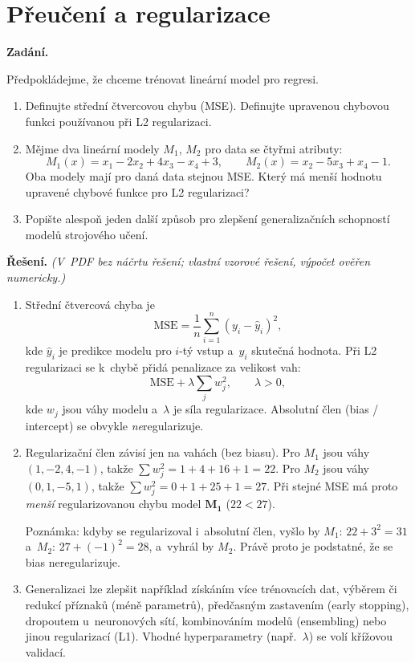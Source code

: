 \section{Přeučení a regularizace}

\noindent\textbf{Zadání.}\par
Předpokládejme, že chceme trénovat lineární model pro regresi.

\begin{enumerate}
  \item Definujte střední čtvercovou chybu (MSE). Definujte upravenou chybovou funkci používanou při L2 regularizaci.
  \item Mějme dva lineární modely $M_1$, $M_2$ pro data se čtyřmi atributy:
    \[
      M_1(x) = x_1 - 2x_2 + 4x_3 - x_4 + 3, \qquad
      M_2(x) = x_2 - 5x_3 + x_4 - 1.
    \]
    Oba modely mají pro daná data stejnou MSE. Který má menší hodnotu upravené chybové funkce pro L2 regularizaci?
  \item Popište alespoň jeden další způsob pro zlepšení generalizačních schopností modelů strojového učení.
\end{enumerate}

\medskip
\noindent\textbf{Řešení.} \textit{(V~PDF bez náčrtu řešení; vlastní vzorové řešení, výpočet ověřen numericky.)}\par
\begin{enumerate}[nosep]
  \item Střední čtvercová chyba je
    \[
      \mathrm{MSE} = \frac{1}{n}\sum_{i=1}^{n} (y_i - \hat{y}_i)^2,
    \]
    kde $\hat{y}_i$ je predikce modelu pro $i$-tý vstup a~$y_i$ skutečná hodnota. Při L2 regularizaci se k~chybě přidá penalizace za velikost vah:
    \[
      \mathrm{MSE} + \lambda \sum_{j} w_j^2, \qquad \lambda > 0,
    \]
    kde $w_j$ jsou váhy modelu a~$\lambda$ je síla regularizace. Absolutní člen (bias / intercept) se obvykle \emph{ne}regularizuje.
  \item Regularizační člen závisí jen na vahách (bez biasu). Pro $M_1$ jsou váhy $(1,-2,4,-1)$, takže $\sum w_j^2 = 1+4+16+1 = 22$. Pro $M_2$ jsou váhy $(0,1,-5,1)$, takže $\sum w_j^2 = 0+1+25+1 = 27$. Při stejné MSE má proto \emph{menší} regularizovanou chybu model $\boldsymbol{M_1}$ ($22 < 27$).

    Poznámka: kdyby se regularizoval i~absolutní člen, vyšlo by $M_1$: $22 + 3^2 = 31$ a~$M_2$: $27 + (-1)^2 = 28$, a~vyhrál by $M_2$. Právě proto je podstatné, že se bias neregularizuje.
  \item Generalizaci lze zlepšit například získáním více trénovacích dat, výběrem či redukcí příznaků (méně parametrů), předčasným zastavením (early stopping), dropoutem u~neuronových sítí, kombinováním modelů (ensembling) nebo jinou regularizací (L1). Vhodné hyperparametry (např.\ $\lambda$) se volí křížovou validací.
\end{enumerate}

